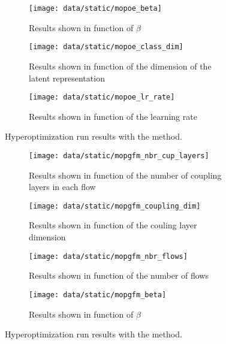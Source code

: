 
\begin{figure}
    \centering
    \begin{subfigure}[b]{0.49\textwidth}
        \centering
        \texttt{[image: data/static/mopoe\_beta]}
        \caption{Results shown in function of $\beta$}
    \end{subfigure}
    \hfill
    \begin{subfigure}[b]{0.49\textwidth}
        \centering
        \texttt{[image: data/static/mopoe\_class\_dim]}
        \caption{Results shown in function of the dimension of the latent representation}
    \end{subfigure}
    \hfill
    \begin{subfigure}[b]{0.5\textwidth}
        \centering
        \texttt{[image: data/static/mopoe\_lr\_rate]}
        \caption{Results shown in function of the learning rate}
    \end{subfigure}
    \caption{Hyperoptimization run results with the  method.}
    \label{fig:mopoe hyperopt}
\end{figure}

\begin{figure}
    \centering
    \begin{subfigure}[b]{0.49\textwidth}
        \centering
        \texttt{[image: data/static/mopgfm\_nbr\_cup\_layers]}
        \caption{Results shown in function of the number of coupling layers in each flow}
    \end{subfigure}
    \hfill
    \begin{subfigure}[b]{0.49\textwidth}
        \centering
        \texttt{[image: data/static/mopgfm\_coupling\_dim]}
        \caption{Results shown in function of the couling layer dimension}
    \end{subfigure}
    \hfill
    \begin{subfigure}[b]{0.49\textwidth}
        \centering
        \texttt{[image: data/static/mopgfm\_nbr\_flows]}
        \caption{Results shown in function of the number of flows}
    \end{subfigure}
    \hfill
    \begin{subfigure}[b]{0.49\textwidth}
        \centering
        \texttt{[image: data/static/mopgfm\_beta]}
        \caption{Results shown in function of $\beta$}
    \end{subfigure}
    \caption{Hyperoptimization run results with the  method.}
    \label{fig:mopgfm hyperopt}
\end{figure}